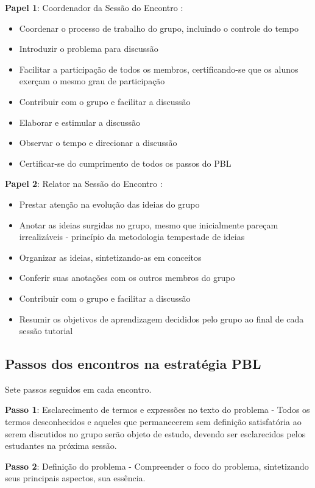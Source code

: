 \documentclass[12pt, onecolumn]{IEEEtran}
\begin{document}
\textbf{Papel 1}: Coordenador da Sessão do Encontro : 
\begin{itemize}
\item 	Coordenar o processo de trabalho do grupo, incluindo o controle do tempo 
\item 	Introduzir o problema para discussão 
\item 	Facilitar a participação de todos os membros, certificando-se que os alunos exerçam o mesmo grau de participação
\item 	Contribuir com o grupo e facilitar a discussão 
\item 	Elaborar e estimular a discussão 
\item 	Observar o tempo e direcionar a discussão 
\item 	Certificar-se do cumprimento de todos os passos do PBL
\end{itemize}

\textbf{Papel 2}: Relator na Sessão do Encontro : 
\begin{itemize}
\item 	Prestar atenção na evolução das ideias do grupo 
\item 	Anotar as ideias surgidas no grupo, mesmo que inicialmente pareçam irrealizáveis - princípio da metodologia tempestade de ideias
\item 	Organizar as ideias, sintetizando-as em conceitos 
\item 	Conferir suas anotações com os outros membros do grupo 
\item 	Contribuir com o grupo e facilitar a discussão 
\item 	Resumir os objetivos de aprendizagem decididos pelo grupo ao final de cada sessão tutorial 
\end{itemize}


\subsection{Passos dos encontros na estratégia PBL}
Sete passos seguidos em cada encontro.

\textbf{Passo 1}: Esclarecimento de termos e expressões no texto do problema - Todos os termos desconhecidos e aqueles que permanecerem sem definição satisfatória ao serem discutidos no grupo serão objeto de estudo, devendo ser esclarecidos pelos estudantes na próxima sessão. 

\textbf{Passo 2}: Definição do problema - Compreender o foco do problema, sintetizando seus principais aspectos, sua essência. 
\end{document}
